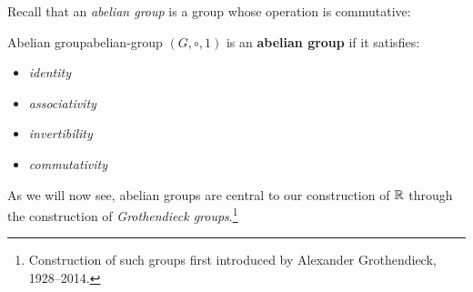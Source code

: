 \documentclass[master.tex]{subfiles}
\begin{document}
        Recall that an \emph{abelian group} is a group whose operation is commutative:
        \begin{definition}{Abelian group}{abelian-group}
            $(G, \circ, 1)$ is an \textbf{abelian group} if it satisfies:
            \begin{itemize}
                \item {} \emph{identity}
                \item {} \emph{associativity}
                \item {} \emph{invertibility}
                \item {} \emph{commutativity}
            \end{itemize}
        \end{definition}
        As we will now see, abelian groups are central to our construction of $\mathbb{R}$ through the construction of \emph{Grothendieck groups}.\footnote{
            Construction of such groups first introduced by Alexander Grothendieck, 1928--2014.
        }
\end{document}
